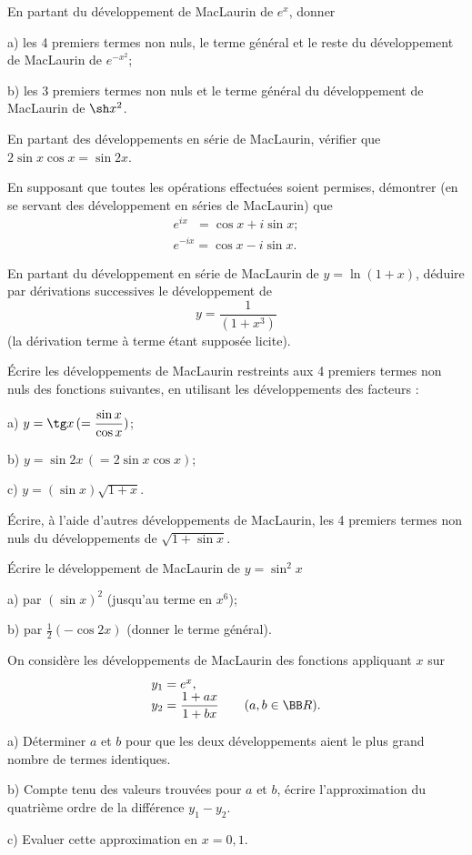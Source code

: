 \documentclass[12pt,french,oneside,a4paper]{memoir} %
\begin{document}
\begin{exo}
En partant du développement de MacLaurin de $e^x$, donner

a) les 4 premiers termes non nuls, le terme général et le reste
du développement de MacLaurin de $\displaystyle{e^{-x^2}}$;

b) les 3 premiers termes non nuls et le terme général du
développement de MacLaurin de $\sh x^2$.
\end{exo}
\begin{exo}
En partant des développements en série de MacLaurin,
vérifier que $2\sin x\cos x=\sin 2x$.
\end{exo}
\begin{exo}
En supposant que toutes les opérations effectuées soient
permises, démontrer (en se servant des développement en séries
de MacLaurin) que
$$
\begin{array}{l}
e^{ix}\phantom{^-}=\cos x+i\sin x;\\
e^{-ix}=\cos x-i\sin x.
\end{array}
$$
\end{exo}
\begin{exo}
En partant du développement en série de MacLaurin de
$y=\ln(1+x)$, déduire par dérivations successives le
développement de 
$$
y=\displaystyle{\frac{1}{(1+x^3)}}
$$
(la dérivation terme à terme étant supposée licite).
\end{exo}
\begin{exo}
Écrire les développements de MacLaurin restreints aux 4
premiers termes non nuls des fonctions suivantes, en utilisant les
développements des facteurs :

a) $\displaystyle{y=\tg x\,(=\frac{\sin x}{\cos x})}$;

b) $y=\sin 2x\,(= 2\sin x\cos x)$;

c) $y=(\sin x)\sqrt{1+x}$.
\end{exo}
\begin{exo}
Écrire, à l'aide d'autres développements de MacLaurin, les
4 premiers termes non nuls du développements de $\sqrt{1+\sin x}$.
\end{exo}
\begin{exo}
Écrire le développement de MacLaurin de $y=\sin^2x$

a) par $(\sin x)^2$ (jusqu'au terme en $x^6$);

b) par $\displaystyle{\frac{1}{2}(-\cos 2x)}$ (donner le terme
général).
\end{exo}
\begin{exo}
On considère les développements de MacLaurin des fonctions
appliquant $x$ sur
$$
\begin{array}{l}
y_1=e^x,\\
y_2=\displaystyle{\frac{1+ax}{1+bx}}\qquad(a, b\in\BB R).
\end{array}
$$

a) Déterminer $a$ et $b$ pour que les deux développements aient
le plus grand nombre de termes identiques.

b) Compte tenu des valeurs trouvées pour $a$ et $b$, écrire
l'approximation du quatrième ordre de la différence $y_1-y_2$.

c) Evaluer cette approximation en $x=0{,}1$.
\end{exo}
\end{document}

